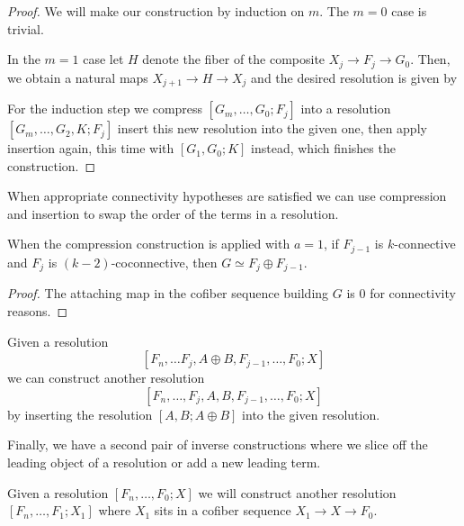 \begin{proof}
  We will make our construction by induction on $m$. The $m=0$ case is trivial.

  In the $m=1$ case let $H$ denote the fiber of the composite
  $ X_j \to F_j \to G_0 $.
  Then, we obtain a natural maps $ X_{j+1} \to H \to X_j $
  and the desired resolution is given by
  \begin{center}
  \end{center}
  
  For the induction step we compress $[G_m, \dots, G_0; F_j]$ into a resolution $[G_m, \dots, G_2, K; F_j]$ insert this new resolution into the given one, then apply insertion again, this time with  $[G_1,G_0; K]$ instead, which finishes the construction.
\end{proof}

When appropriate connectivity hypotheses are satisfied we can use compression and insertion to swap the order of the terms in a resolution.

\begin{lem}
  When the compression construction is applied with $a=1$, if $F_{j-1}$ is $k$-connective and $F_j$ is $(k-2)$-coconnective, then $G \simeq F_j \oplus F_{j-1}$. 
\end{lem}

\begin{proof}
  The attaching map in the cofiber sequence building $G$ is 0 for connectivity reasons.
\end{proof}

\begin{cnstr}[Swapping]
  Given a resolution
  $$ [F_n, \dots F_j, A \oplus B, F_{j-1}, \dots, F_0; X] $$
  we can construct another resolution
  $$ [F_n, \dots, F_j, A, B, F_{j-1}, \dots, F_0; X] $$
  by inserting the resolution $[A,B; A \oplus B]$ into the given resolution.
\end{cnstr}

Finally, we have a second pair of inverse constructions where we slice off the leading object of a resolution or add a new leading term.

\begin{cnstr}[Slicing]
  Given a resolution $ [F_n, \dots, F_0; X] $
  we will construct another resolution
  $ [F_n, \dots, F_1; X_1] $
  where $X_1$ sits in a cofiber sequence $X_1 \to X \to F_0$.
\end{cnstr}

